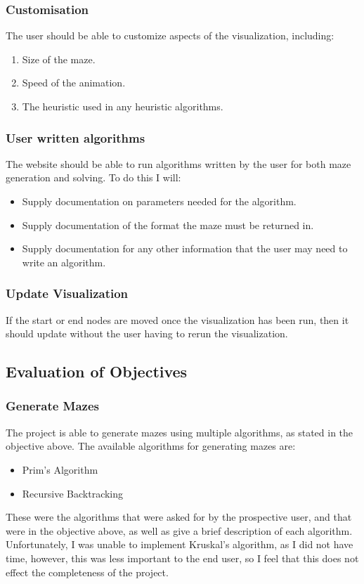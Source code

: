 \documentclass[titlepage]{article}
\begin{document}
\subsubsection{Customisation}
The user should be able to customize aspects of the visualization, including:
\begin{enumerate}
    \item Size of the maze.
    \item Speed of the animation.
    \item The heuristic used in any heuristic algorithms.
\end{enumerate}

\subsubsection{User written algorithms}
The website should be able to run algorithms written by the user for both maze generation and solving. To do this I will:
\begin{itemize}
    \item Supply documentation on parameters needed for the algorithm.
    \item Supply documentation of the format the maze must be returned in.
    \item Supply documentation for any other information that the user may need to write an algorithm.
\end{itemize}

\subsubsection{Update Visualization}
If the start or end nodes are moved once the visualization has been run, then it should update without the user having to rerun the visualization.

\subsection{Evaluation of Objectives}
\subsubsection{Generate Mazes}
The project is able to generate mazes using multiple algorithms, as stated in the objective above. The available algorithms for generating mazes are:
\begin{itemize}
    \item Prim's Algorithm
    \item Recursive Backtracking
\end{itemize}
These were the algorithms that were asked for by the prospective user, and that were in the objective above, as well as give a brief description of each algorithm. Unfortunately, I was unable to implement Kruskal's algorithm, as I did not have time, however, this was less important to the end user, so I feel that this does not effect the completeness of the project.
\end{document}

